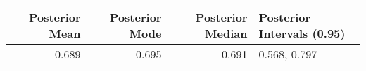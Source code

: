 \begin{tabular}{rrrl}
\toprule
Posterior Mean & Posterior Mode & Posterior Median & Posterior Intervals (0.95) \\
\midrule
0.689 & 0.695 & 0.691 & 0.568, 0.797 \\
\bottomrule
\end{tabular}
